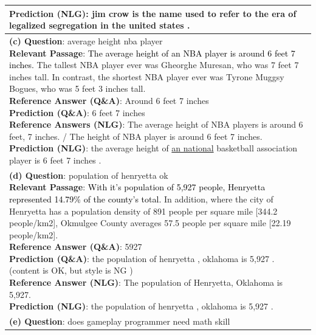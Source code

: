 \documentclass[11pt,a4paper]{article}
\newcommand{\cmark}{\ding{51}}%
\newcommand{\xmark}{\ding{55}}%
\theoremstyle{mydef}
\theoremstyle{myprob}
\begin{document}
\begin{table}[h!]
{\begin{tabular}{p{50em}}
{\textbf{Prediction (NLG)}: jim crow is the name used to refer to the era of legalized segregation in the united states . \cmark
}
\vspace{1pt}
\\ \hline
\vspace{0.5pt}
\pbox{50em}{
\textbf{(c) Question}: average height nba player\\
\textbf{Relevant Passage}: \textcolor{black}{The average height of an NBA player is around 6 feet 7 inches.} The tallest NBA player ever was Gheorghe Muresan, who was 7 feet 7 inches tall. In contrast, the shortest NBA player ever was Tyrone Muggsy Bogues, who was 5 feet 3 inches tall. \\
\textbf{Reference Answer (Q\&A)}: Around 6 feet 7 inches \\
\textbf{Prediction (Q\&A)}: 6 feet 7 inches	\cmark \\
\textbf{Reference Answers (NLG)}: The average height of NBA players is around 6 feet, 7 inches. / The height of NBA player is around 6 feet 7 inches.\\
\textbf{Prediction (NLG)}: the average height of \underline{an national} basketball association player is 6 feet 7 inches . \cmark
}
\vspace{1pt}
\\ \hline 
\vspace{0.5pt}
\pbox{50em}{
\textbf{(d) Question}: population of henryetta ok\\
\textbf{Relevant Passage}: \textcolor{black}{With it's population of 5,927 people, Henryetta represented 14.79\% of the county's total.} In addition, where the city of Henryetta has a population density of 891 people per square mile [344.2 people/km2], Okmulgee County averages 57.5 people per square mile [22.19 people/km2].\\
\textbf{Reference Answer (Q\&A)}: 5927 \\
\textbf{Prediction (Q\&A)}: the population of henryetta , oklahoma is 5,927 .   \cmark \hspace{.5em} (content is OK, but style is NG \xmark)\\
\textbf{Reference Answer (NLG)}: The population of Henryetta, Oklahoma is 5,927. \\
\textbf{Prediction (NLG)}:  the population of henryetta , oklahoma is 5,927 . \cmark
}
\vspace{1pt}
\\ \hline 
\vspace{0.5pt}
\pbox{50em}{
\textbf{(e) Question}: does gameplay programmer need math skill\\
}
\end{tabular}}
\end{table}
\end{document}
